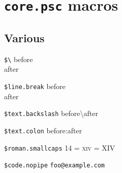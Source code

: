 \documentclass[demo]{pyscribe}
\begin{document}
\chapter{\texttt{core.psc} macros}

\section{Various}

\par\medskip
\texttt{\$\textbackslash{}} before \\ after
\par\medskip
\texttt{\$line.break} before \\ after

\par\medskip
\texttt{\$text.backslash} before\textbackslash{}after
\par\medskip
\texttt{\$text.colon} before\string:after
\par\medskip
\texttt{\$roman.smallcaps} 14 = \textsc{xiv} = XIV
\par\medskip
\texttt{\$code.nopipe} \verb|foo@example.com|
\end{document}
